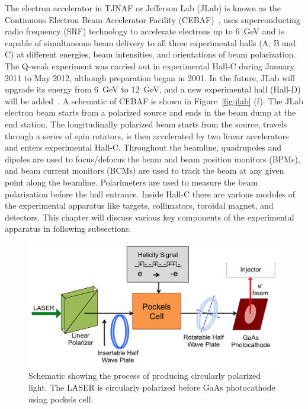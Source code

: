 The electron accelerator in TJNAF or Jefferson Lab (JLab) is known as the Continuous Electron Beam Accelerator Facility 
(CEBAF)~\cite{Leemann_CEBAF}, uses superconducting radio frequency (SRF) technology to accelerate electrons up to 6~GeV and is capable of simultaneous beam delivery to all three experimental halls (A, B and C) at different energies, beam intensities, and orientations of beam polarization. The Q-weak experiment was carried out in experimental Hall-C during January 2011 to May 2012, although preparation began in 2001. In the future, JLab will upgrade its energy from 6~GeV to 12~GeV, and a new experimental hall (Hall-D) will be added~\cite{website:jlab_12GeV}. A schematic of CEBAF is shown in Figure~\ref{fig:jlab} (f). The JLab electron beam starts from a polarized source and ends in the beam dump at the end station. The longitudinally polarized beam starts from the source, travels through a series of spin rotators, is then accelerated by two linear accelerators and enters experimental Hall-C. Throughout the beamline, quadrupoles and dipoles are used to focus/defocus the beam and beam position monitors (BPMs), and beam current monitors (BCMs) are used to track the beam at any given point along the beamline. 
Polarimeters are used to measure the beam polarization before the hall entrance. 
Inside Hall-C there are various modules of the experimental apparatus like targets, collimators, toroidal magnet, and detectors.
This chapter will discuss various key components of the experimental apparatus in following subsections.

\begin{singlespace}
\begin{figure}[!h]
	\begin{center}
	\includegraphics[width=15.0cm]{figures/source}
	\end{center}
	\caption
	{Schematic showing the process of producing circularly polarized light. The LASER is circularly polarized before GaAs photocathode using pockels cell.}
	\label{fig:source}
\end{figure}
\end{singlespace}



